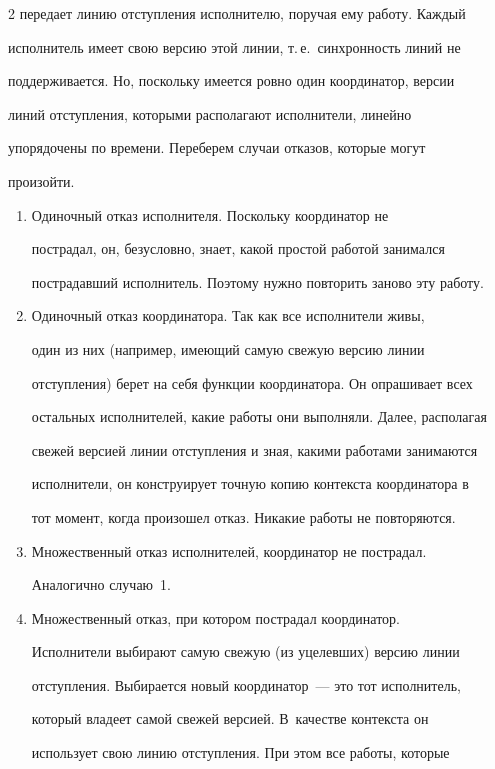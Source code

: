 \begin{multicols}{2}
передает линию отступления исполнителю, поручая ему работу. Каж\-дый 


исполнитель имеет свою версию этой линии, т.\,е.\ синхронность линий не 


поддерживается. Но, поскольку имеется ровно один координатор, версии 


линий отступления, которыми располагают исполнители, линейно 


упорядочены по времени. Переберем случаи отказов, которые могут 


произойти.


      \begin{enumerate}


\item Одиночный отказ исполнителя. Поскольку координатор не 


пострадал, он, безусловно, знает, какой простой работой занимался 


пострадавший исполнитель. Поэтому нужно повторить заново эту работу.


\item Одиночный отказ координатора. Так как все исполнители живы, 


один из них (например, имеющий самую свежую версию линии 


отступления) берет на себя функции координатора. Он опрашивает всех 


остальных исполнителей, какие работы они выполняли. Далее, располагая 


свежей версией линии отступления и зная, какими работами занимаются 


исполнители, он конструирует точную копию контекста координатора в 


тот момент, когда произошел отказ. Никакие работы не повторяются.


\item Множественный отказ исполнителей, координатор не пострадал. 


Аналогично случаю~1.


\item Множественный отказ, при котором пострадал координатор. 


Исполнители выбирают самую свежую (из уцелевших) версию линии 


отступления. Выбирается новый координатор~--- это тот исполнитель, 


который владеет самой свежей версией. В~качестве контекста он 


использует свою линию отступления. При этом все работы, которые 



\end{enumerate}
\end{multicols}
